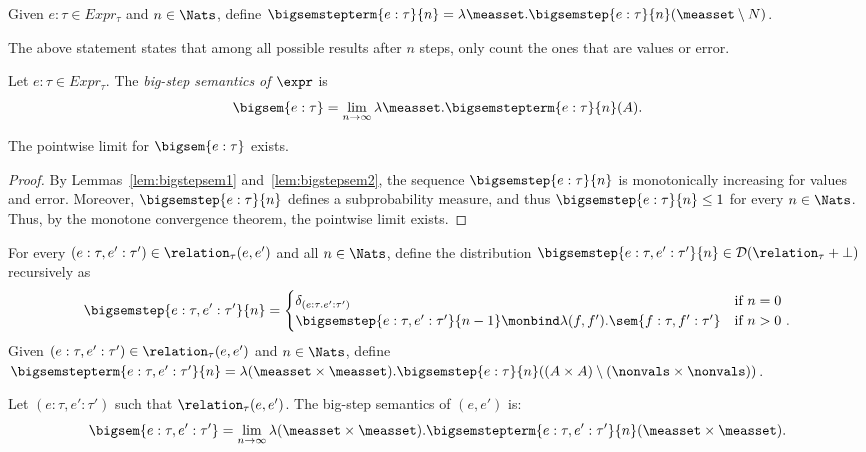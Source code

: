 Given $e : \tau \in Expr_{\tau}$ and $n\in\Nats$, define $\bigsemstepterm{e : \tau}{n} = \lambda \measset. \bigsemstep{e : \tau}{n}(\measset \setminus N)$. 

The above statement states that among all possible results after $n$ steps, only count the ones that are values or error.

\begin{definition}
	Let $e : \tau \in Expr_{\tau}$. The \emph{big-step semantics of $\expr$} is 
	\[
		\bigsem{e : \tau} = \lim_{n \to \infty} \lambda \measset.
		\bigsemstepterm{e : \tau}{n}(A).
	\]
\end{definition}

\begin{lemma}
	The pointwise limit for $\bigsem{e : \tau}$ exists.
\end{lemma}

\begin{proof}
	By Lemmas~\ref{lem:bigstepsem1} and~\ref{lem:bigstepsem2}, the sequence $\bigsemstep{e : \tau}{n}$ is monotonically increasing for values and error. Moreover, $\bigsemstep{e : \tau}{n}$ defines a subprobability measure, and thus $\bigsemstep{e : \tau}{n} \leq 1$ for every $n \in \Nats$. Thus, by the monotone convergence theorem, the pointwise limit exists.
\end{proof}

\begin{definition}\label{def:big-step-2}
	For every $(e : \tau, e' : \tau') \in \relation_{\tau}(e,e')$ and all $n \in \Nats$, define the distribution $\bigsemstep{e : \tau, e' : \tau'}{n} \in \mathcal{D}(\relation_{\tau} + \bot)$ recursively as
	\[
		\bigsemstep{e : \tau, e' : \tau'}{n} = 
		\begin{cases}
			\delta_{(e : \tau. e' : \tau')} & \text{if $n = 0$} \\
			\bigsemstep{e : \tau, e' : \tau'}{n-1} \monbind  \lambda (f,f'). \sem{f : \tau, f' : \tau'} & \text{if $n > 0$}~.
		\end{cases}
	\]
	Given $(e : \tau, e' : \tau') \in \relation_{\tau}(e,e')$ and $n \in \Nats$, define $\bigsemstepterm{e : \tau, e' : \tau'}{n} = \lambda (\measset \times \measset). \bigsemstep{e : \tau}{n}((A \times A) \setminus (\nonvals \times \nonvals))$. 

	Let $(e : \tau, e' : \tau')$ such that $\relation_{\tau}(e,e')$. The big-step semantics of $(e,e')$ is:
	\[
	\bigsem{e : \tau, e' : \tau'} = \lim_{n \to \infty} \lambda (\measset \times \measset).\bigsemstepterm{e : \tau, e' : \tau'}{n}(\measset \times \measset).
	\]
\end{definition}

